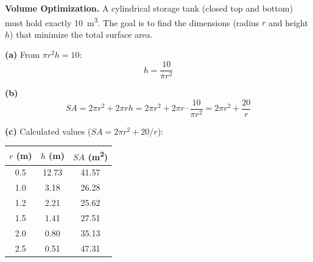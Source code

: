 \documentclass[addpoints]{exam}
\begin{document}
\begin{questions}
\vspace{5mm}

\question[8]
\textbf{Volume Optimization.}
A cylindrical storage tank (closed top and bottom) must hold exactly \SI{10}{m^3}. The goal is to find the dimensions (radius $r$ and height $h$) that minimize the total surface area.


\begin{solution}
\textbf{(a)} From $\pi r^2 h = 10$:
\[
h = \frac{10}{\pi r^2}
\]

\textbf{(b)}
\[
SA = 2\pi r^2 + 2\pi r h = 2\pi r^2 + 2\pi r \cdot \frac{10}{\pi r^2} = 2\pi r^2 + \frac{20}{r}
\]

\textbf{(c)} Calculated values ($SA = 2\pi r^2 + 20/r$):

\begin{center}
\begin{tabular}{@{}ccc@{}}
\toprule
$r$ (m) & $h$ (m) & $SA$ (\si{m^2}) \\
\midrule
0.5 & 12.73 & 41.57 \\
1.0 & 3.18  & 26.28 \\
1.2 & 2.21  & 25.62 \\
1.5 & 1.41  & 27.51 \\
2.0 & 0.80  & 35.13 \\
2.5 & 0.51  & 47.31 \\
\bottomrule
\end{tabular}
\end{center}


\end{solution}
\end{questions}
\end{document}

